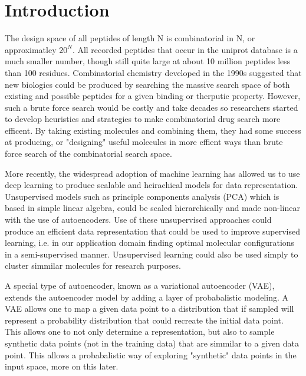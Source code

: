 \documentclass[preprint,12pt]{elsarticle}
\begin{document}
\linenumbers

\section{Introduction}

The design space of all peptides of length N is combinatorial in N, or approximatley $20^N$. All recorded peptides that occur in the uniprot database is a much smaller number, though still quite large at about 10 million peptides less than 100 residues. Combinatorial chemistry developed in the 1990s suggested that new biologics could be produced by searching the massive search space of both existing and possible peptides for a given binding or therputic property. However, such a brute force search would be costly and take decades so researchers started to develop heuristics and strategies to make combinatorial drug search more efficent\cite{feher2003property}. By taking existing molecules and combining them, they had some success at producing, or "designing" useful molecules in more effient ways than brute force search of the combinatorial search space.

More recently, the widespread adoption of machine learning has allowed us to use deep learning to produce scalable and heirachical models for data representation. Unsupervised models such as principle components analysis (PCA) which is based in simple linear algebra, could be scaled hierarchically and made non-linear with the use of autoencoders\cite{hinton1994autoencoders}. Use of these unsupervised approaches could produce an efficient data representation that could be used to improve supervised learning, i.e. in our application domain finding optimal molecular configurations in a semi-supervised manner. Unsupervised learning could also be used simply to cluster simmilar molecules for research purposes.

A special type of autoencoder, known as a variational autoencoder (VAE), extends the autoencoder model by adding a layer of probabalistic modeling\cite{kingma2013auto}. A VAE allows one to map a given data point to a distribution that if sampled will represent a probability distribution that could recreate the initial data point. This allows one to not only determine a representation, but also to sample synthetic data points (not in the training data) that are simmilar to a given data point. This allows a probabalistic way of exploring "synthetic" data points in the input space, more on this later.
\end{document}
